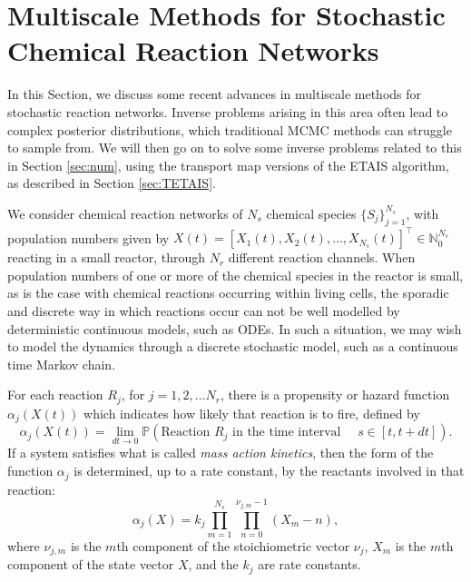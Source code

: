 \documentclass[final]{siamltex}
\begin{document}

\section{Multiscale Methods for Stochastic Chemical Reaction
  Networks}\label{sec:multi}
In this Section, we discuss some recent advances in multiscale methods
for stochastic reaction networks. Inverse problems arising in this
area often lead to complex posterior
distributions, which traditional MCMC methods can struggle to sample
from. We will then go on to solve some inverse problems related to
this in Section \ref{sec:num}, using the transport map versions of the
ETAIS algorithm, as described in Section \ref{sec:TETAIS}.

We consider chemical reaction networks of $N_s$ chemical species $\{S_j\}_{j=1}^{N_s}$,
with population numbers given by $X(t) = [X_1(t), X_2(t), \ldots, X_{N_s}(t)]^\top \in
\mathbb{N}_0^{N_s}$ reacting in a small reactor, through $N_r$ different reaction
channels. When population numbers of one or more of the chemical
species in the reactor is small, as is the case with chemical
reactions occurring within living cells, the sporadic and discrete way
in which reactions occur can not be well modelled by deterministic
continuous models, such as ODEs. In such a situation, we may wish to
model the dynamics through a discrete stochastic model, such as a
continuous time Markov chain.

For each reaction $R_j$, for $j = 1,2,\ldots N_r$, there is a
propensity or hazard function $\alpha_j(X(t))$ which indicates how
likely that reaction is to fire, defined by
\[\alpha_j(X(t)) = \lim_{dt \to 0} \mathbb{P}(\text{Reaction $R_j$ in
    the time interval  } \quad s \in [t, t+ dt] ).\] If a system
satisfies what is called \emph{mass action kinetics}, then the form of
the function $\alpha_j$ is determined, up to a rate constant, by the
reactants involved in that reaction:
\begin{equation}\label{eq:MAK}
\alpha_j(X) = k_j \prod_{m=1}^{N_s} \prod_{n=0}^{\nu_{j,m} -1} (X_m - n),
\end{equation}
where $\nu_{j,m}$ is the $m$th component of the stoichiometric vector
$\nu_j$, $X_m$ is the $m$th component of the state vector $X$, and the
$k_j$ are rate constants.
\end{document}
